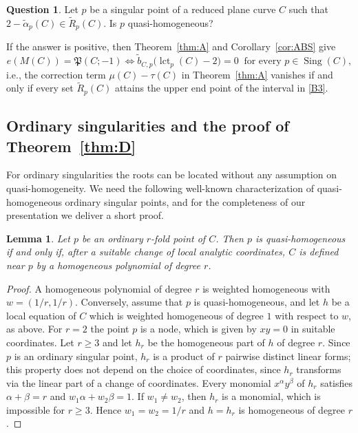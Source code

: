 \documentclass[11pt]{amsart}
\newtheorem{lemma}[theorem]{Lemma}
\theoremstyle{definition}
\newtheorem{question}[theorem]{Question}
\numberwithin{equation}{section}
\newcommand{\Pfrak}{\mathfrak{P}}
\newcommand{\tb}{\widetilde{b}}
\newcommand{\tR}{\widetilde{R}}
\newcommand{\talpha}{\widetilde{\alpha}}
\DeclareMathOperator{\Sing}{Sing}
\DeclareMathOperator{\lct}{lct}
\begin{document}
\begin{question}\label{q:sym}
Let $p$ be a singular point of a reduced plane curve $C$ such that $2-\talpha_p(C)\in\tR_p(C)$.
Is $p$ quasi-homogeneous?
\end{question}
If the answer is positive, then Theorem~\ref{thm:A} and Corollary~\ref{cor:ABS} give
\[
e(M(C))=\Pfrak(C;-1)\iff\tb_{C,p}\bigl(\lct_p(C)-2\bigr)=0\ \text{ for every }p\in\Sing(C),
\]
i.e., the correction term $\mu(C)-\tau(C)$ in Theorem~\ref{thm:A} vanishes if and only if every set $\tR_p(C)$ attains the upper end point of the interval in \ref{B3}.


\subsection*{Ordinary singularities and the proof of Theorem~\ref{thm:D}}
For ordinary singularities the roots can be located without any assumption on quasi-homogeneity.
We need the following well-known characterization of quasi-homogeneous ordinary singular points, and for the completeness of our presentation we deliver a short proof.
\begin{lemma}\label{lem:ordqh}
Let $p$ be an ordinary $r$-fold point of $C$.
Then $p$ is quasi-homogeneous if and only if, after a suitable change of local analytic coordinates, $C$ is defined near $p$ by a homogeneous polynomial of degree $r$.
\end{lemma}

\begin{proof}
A homogeneous polynomial of degree $r$ is weighted homogeneous with $w=(1/r,1/r)$.
Conversely, assume that $p$ is quasi-homogeneous, and let $h$ be a local equation of $C$ which is weighted homogeneous of degree $1$ with respect to $w$, as above.
For $r=2$ the point $p$ is a node, which is given by $xy=0$ in suitable coordinates.
Let $r\ge3$ and let $h_r$ be the homogeneous part of $h$ of degree $r$.
Since $p$ is an ordinary singular point, $h_r$ is a product of $r$ pairwise distinct linear forms; this property does not depend on the choice of coordinates, since $h_r$ transforms via the linear part of a change of coordinates.
Every monomial $x^\alpha y^\beta$ of $h_r$ satisfies $\alpha+\beta=r$ and $w_1\alpha+w_2\beta=1$.
If $w_1\neq w_2$, then $h_r$ is a monomial, which is impossible for $r\ge3$.
Hence $w_1=w_2=1/r$ and $h=h_r$ is homogeneous of degree $r$.
\end{proof}
\end{document}
